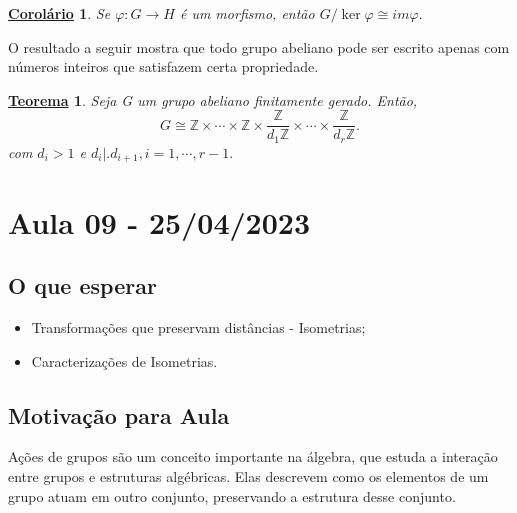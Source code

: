 \documentclass{article}
\newtheorem*{theorem*}{\underline{Teorema}}
\newtheorem*{crl*}{\underline{Corol\'ario}}
\begin{document}
\begin{crl*}
  Se $\varphi:G\rightarrow H$ \'e um morfismo, ent\~ao $G/\ker{\varphi}\cong im\varphi.$
\end{crl*}

  O resultado a seguir mostra que todo grupo abeliano pode ser escrito apenas com n\'umeros inteiros que satisfazem certa propriedade.
 \begin{theorem*}
   Seja G um grupo abeliano finitamente gerado. Ent\~ao, 
     $$
       G\cong{} \mathbb{Z}\times \cdots\times \mathbb{Z}\times \frac{\mathbb{Z}}{d_{1}\mathbb{Z}}\times \cdots\times \frac{\mathbb{Z}}{d_{r} \mathbb{Z}}.
     $$
     com $d_{i} > 1$ e $d_{i}\bigl|\bigr. d_{i+1}, i=1,\cdots,r-1.$ 
 \end{theorem*}
\newpage

\section{Aula 09 - 25/04/2023}
\subsection{O que esperar}
\begin{itemize}
  \item Transforma\c c\~oes que preservam dist\^ancias - Isometrias;
  \item Caracteriza\c c\~oes de Isometrias.
\end{itemize}

\subsection{Motiva\c c\~ao para Aula}
  Ações de grupos são um conceito importante na álgebra, que estuda a interação entre grupos e estruturas algébricas. 
Elas descrevem como os elementos de um grupo atuam em outro conjunto, preservando a estrutura desse conjunto.
\end{document}

